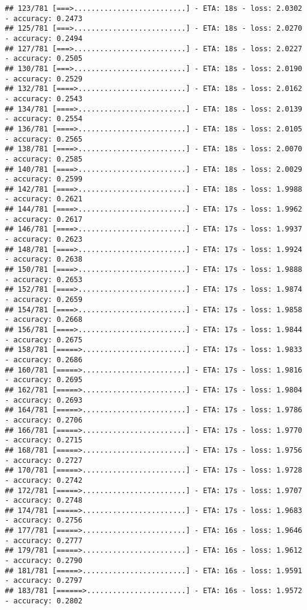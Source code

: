 \documentclass[
]{article}
\begin{document}
\begin{verbatim}
## 123/781 [===>..........................] - ETA: 18s - loss: 2.0302 - accuracy: 0.2473
## 125/781 [===>..........................] - ETA: 18s - loss: 2.0270 - accuracy: 0.2494
## 127/781 [===>..........................] - ETA: 18s - loss: 2.0227 - accuracy: 0.2505
## 130/781 [===>..........................] - ETA: 18s - loss: 2.0190 - accuracy: 0.2529
## 132/781 [====>.........................] - ETA: 18s - loss: 2.0162 - accuracy: 0.2543
## 134/781 [====>.........................] - ETA: 18s - loss: 2.0139 - accuracy: 0.2554
## 136/781 [====>.........................] - ETA: 18s - loss: 2.0105 - accuracy: 0.2565
## 138/781 [====>.........................] - ETA: 18s - loss: 2.0070 - accuracy: 0.2585
## 140/781 [====>.........................] - ETA: 18s - loss: 2.0029 - accuracy: 0.2599
## 142/781 [====>.........................] - ETA: 18s - loss: 1.9988 - accuracy: 0.2621
## 144/781 [====>.........................] - ETA: 17s - loss: 1.9962 - accuracy: 0.2617
## 146/781 [====>.........................] - ETA: 17s - loss: 1.9937 - accuracy: 0.2623
## 148/781 [====>.........................] - ETA: 17s - loss: 1.9924 - accuracy: 0.2638
## 150/781 [====>.........................] - ETA: 17s - loss: 1.9888 - accuracy: 0.2653
## 152/781 [====>.........................] - ETA: 17s - loss: 1.9874 - accuracy: 0.2659
## 154/781 [====>.........................] - ETA: 17s - loss: 1.9858 - accuracy: 0.2668
## 156/781 [====>.........................] - ETA: 17s - loss: 1.9844 - accuracy: 0.2675
## 158/781 [=====>........................] - ETA: 17s - loss: 1.9833 - accuracy: 0.2686
## 160/781 [=====>........................] - ETA: 17s - loss: 1.9816 - accuracy: 0.2695
## 162/781 [=====>........................] - ETA: 17s - loss: 1.9804 - accuracy: 0.2693
## 164/781 [=====>........................] - ETA: 17s - loss: 1.9786 - accuracy: 0.2706
## 166/781 [=====>........................] - ETA: 17s - loss: 1.9770 - accuracy: 0.2715
## 168/781 [=====>........................] - ETA: 17s - loss: 1.9756 - accuracy: 0.2727
## 170/781 [=====>........................] - ETA: 17s - loss: 1.9728 - accuracy: 0.2742
## 172/781 [=====>........................] - ETA: 17s - loss: 1.9707 - accuracy: 0.2748
## 174/781 [=====>........................] - ETA: 17s - loss: 1.9683 - accuracy: 0.2756
## 177/781 [=====>........................] - ETA: 16s - loss: 1.9646 - accuracy: 0.2777
## 179/781 [=====>........................] - ETA: 16s - loss: 1.9612 - accuracy: 0.2790
## 181/781 [=====>........................] - ETA: 16s - loss: 1.9591 - accuracy: 0.2797
## 183/781 [======>.......................] - ETA: 16s - loss: 1.9572 - accuracy: 0.2802

\end{verbatim}
\end{document}
